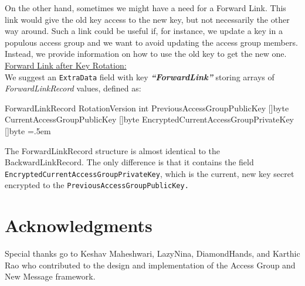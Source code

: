 \documentclass[oneside, 12pt]{article}
\newenvironment{lcverbatim}
 {\SaveVerbatim{cverb}}
 {\endSaveVerbatim
  \flushleft\fboxrule=0pt\fboxsep=.5em
  \colorbox{cverbbg}{%
    \makebox[\dimexpr\linewidth-2\fboxsep][l]{\BUseVerbatim{cverb}}%
  }
  \endflushleft
}
\begin{document}
\noindent On the other hand, sometimes we might have a need for a Forward Link. This link would give the old key access to the new key, but not necessarily the other way around. Such a link could be useful if, for instance, we update a key in a populous access group and we want to avoid updating the access group members. Instead, we provide information on how to use the old key to get the new one.\\

\noindent\underline{Forward Link after Key Rotation:}\\
\noindent We suggest an \texttt{ExtraData} field with key \textbf{\textit{“ForwardLink”}} storing arrays of \textit{ForwardLinkRecord} values, defined as:

\begin{lcverbatim}
ForwardLinkRecord
{
    RotationVersion                       int
    PreviousAccessGroupPublicKey          []byte
    CurrentAccessGroupPublicKey           []byte
    EncryptedCurrentAccessGroupPrivateKey []byte
}
\end{lcverbatim}

\noindent The ForwardLinkRecord structure is almost identical to the BackwardLinkRecord. The only difference is that it contains the field \texttt{EncryptedCurrentAccessGroupPrivateKey}, which is the current, new key secret encrypted to the \texttt{PreviousAccessGroupPublicKey.}

\section{Acknowledgments}
Special thanks go to Keshav Maheshwari, LazyNina, DiamondHands, and Karthic Rao who contributed to the design and implementation of the Access Group and New Message framework.
\end{document}
